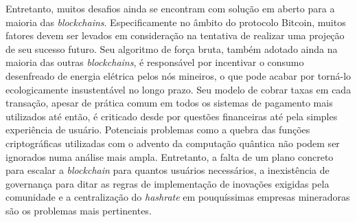 \documentclass[a4paper,12pt]{monografia}
\theoremstyle{plain}
\theoremstyle{definition}
\theoremstyle{remark}
\begin{document}
Entretanto, muitos desafios ainda se encontram com solu\c{c}\~{a}o em aberto para a maioria das \textit{blockchains}.
Especificamente no \^{a}mbito do protocolo Bitcoin, muitos fatores devem ser levados em considera\c{c}\~{a}o na tentativa de realizar uma proje\c{c}\~{a}o de seu sucesso futuro.
Seu algoritmo de for\c{c}a bruta, tamb\'{e}m adotado ainda na maioria das outras \textit{blockchains}, \'{e} respons\'{a}vel por incentivar o consumo desenfreado de energia el\'{e}trica pelos n\'{o}s mineiros, o que pode acabar por torn\'{a}-lo ecologicamente insustent\'{a}vel no longo prazo.
Seu modelo de cobrar taxas em cada transa\c{c}\~{a}o, apesar de pr\'{a}tica comum em todos os sistemas de pagamento mais utilizados at\'{e} ent\~{a}o, \'e criticado desde por quest\~oes financeiras at\'e pela simples experi\^encia de usu\'ario.
Potenciais problemas como a quebra das fun\c{c}\~{o}es criptogr\'{a}ficas utilizadas com o advento da computa\c{c}\~{a}o qu\^{a}ntica n\~{a}o podem ser ignorados numa an\'{a}lise mais ampla.
Entretanto, a falta de um plano concreto para escalar a \textit{blockchain} para quantos usu\'{a}rios necess\'{a}rios, a inexist\^{e}ncia de governan\c{c}a para ditar as regras de implementa\c{c}\~{a}o de inova\c{c}\~{o}es exigidas pela comunidade e a centraliza\c{c}\~{a}o do \textit{hashrate} em pouqu\'{i}ssimas empresas mineradoras s\~{a}o os problemas mais pertinentes.

\singlespacing


\end{document}
